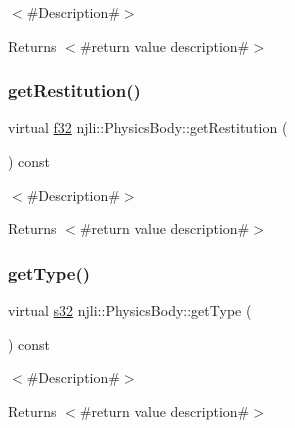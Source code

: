 $<$\#\+Description\#$>$

\begin{DoxyReturn}{Returns}
$<$\#return value description\#$>$ 
\end{DoxyReturn}
\mbox{\label{classnjli_1_1_physics_body_a1b125030c9a2abf3c450ef4e1dc492c3}} 
\subsubsection{\texorpdfstring{get\+Restitution()}{getRestitution()}}
{\footnotesize\ttfamily virtual \mbox{\hyperlink{_util_8h_a5f6906312a689f27d70e9d086649d3fd}{f32}} njli\+::\+Physics\+Body\+::get\+Restitution (\begin{DoxyParamCaption}{ }\end{DoxyParamCaption}) const\hspace{0.3cm}{\ttfamily [virtual]}}

$<$\#\+Description\#$>$

\begin{DoxyReturn}{Returns}
$<$\#return value description\#$>$ 
\end{DoxyReturn}
\mbox{\label{classnjli_1_1_physics_body_a1338648bed55e4ca2d3c50d953fd60c4}} 
\subsubsection{\texorpdfstring{get\+Type()}{getType()}}
{\footnotesize\ttfamily virtual \mbox{\hyperlink{_util_8h_aa62c75d314a0d1f37f79c4b73b2292e2}{s32}} njli\+::\+Physics\+Body\+::get\+Type (\begin{DoxyParamCaption}{ }\end{DoxyParamCaption}) const\hspace{0.3cm}{\ttfamily [pure virtual]}}

$<$\#\+Description\#$>$

\begin{DoxyReturn}{Returns}
$<$\#return value description\#$>$ 
\end{DoxyReturn}


